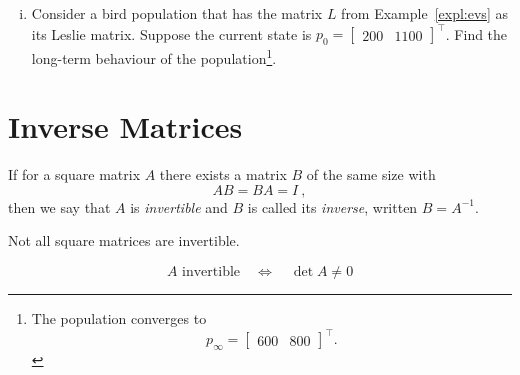 \begin{exercise}
\begin{enumerate}[(i)]
 	\item Consider a bird population that has the matrix $L$ from Example~\ref{expl:evs} as its Leslie matrix. Suppose the current state is $p_0=\begin{bmatrix} 200 & 1100 \end{bmatrix}^\top$. Find the long-term behaviour of the population\footnote{The population converges to
 		\[ p_\infty = \begin{bmatrix} 600 & 800 \end{bmatrix}^\top. \]}.
\end{enumerate}
\end{exercise}


\section{Inverse Matrices}

\begin{definition}
	If for a square matrix $A$ there exists a matrix $B$ of the same size with 
	\[ AB = BA = I \:, \]
	then we say that $A$ is \emph{invertible} and $B$ is called its \emph{inverse}, written $B=A^{-1}$.
\end{definition}

\begin{remark}
Not all square matrices are invertible.
\end{remark}

\begin{theorem}
\label{thm:invertibility}
\[ A \text{~invertible} \quad \Longleftrightarrow \quad \det A \not=0 \]
\end{theorem}

